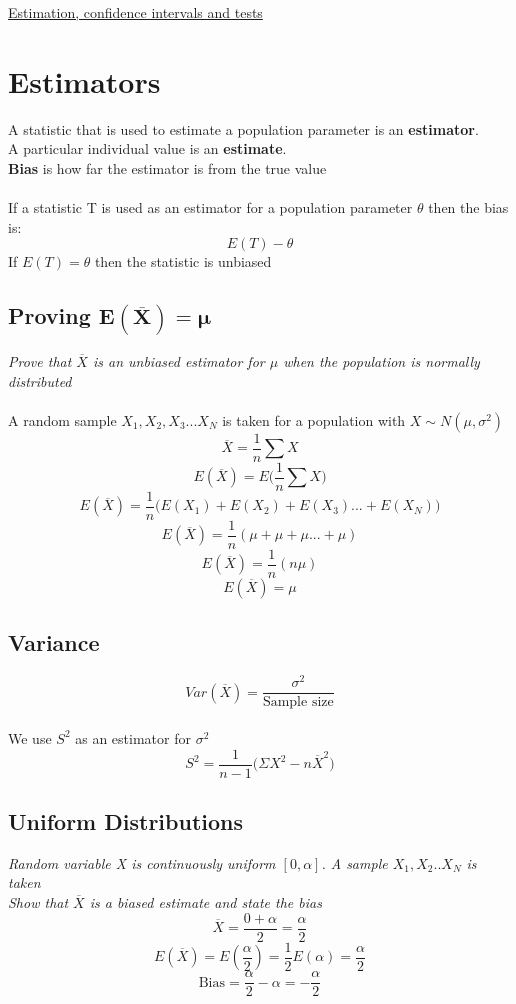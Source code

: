 \documentclass{article}[18pt]
\begin{document}
\begin{center}
\underline{\huge Estimation, confidence intervals and tests}
\end{center}
\section{Estimators}
A statistic that is used to estimate a population parameter is an \textbf{estimator}.\\
A particular individual value is an \textbf{estimate}.\\
\textbf{Bias} is how far the estimator is from the true value\\
\\
If a statistic T is used as an estimator for a population parameter $\theta$ then the bias is:
$$E(T)-\theta$$
If $E(T)=\theta$ then the statistic is unbiased
\subsection{Proving $\mathbf{E(\overline{X})=\mu}$}
\textit{Prove that $\overline{X}$ is an unbiased estimator for $\mu$ when the population is normally distributed}\\
\\
A random sample $X_1,X_2,X_3...X_N$ is taken for a population with $X\sim N(\mu,\sigma^2)$
$$\overline{X}=\frac{1}{n}\sum X$$
$$E(\overline{X})=E\Big(\frac{1}{n}\sum X\Big)$$
$$E(\overline{X})=\frac{1}{n}\big(E(X_1)+E(X_2)+E(X_3)...+E(X_N)\big)$$
$$E(\overline{X})=\frac{1}{n}(\mu+\mu+\mu...+\mu)$$
$$E(\overline{X})=\frac{1}{n}(n\mu)$$
$$E(\overline{X})=\mu$$
\subsection{Variance}
$$Var(\overline{X})=\frac{\sigma^2}{\textrm{Sample size}}$$
\\
We use $S^2$ as an estimator for $\sigma^2$
$$S^2=\frac{1}{n-1}\Big(\Sigma X^2-n\overline{X}^2\Big)$$
\subsection{Uniform Distributions}
\textit{Random variable X is continuously uniform $[0,\alpha]$. A sample $X_1,X_2..X_N$ is taken}\\
\textit{Show that $\overline{X}$ is a biased estimate and state the bias}
$$\overline{X}=\frac{0+\alpha}{2}=\frac{\alpha}{2}$$
$$E(\overline{X})=E(\frac{\alpha}{2})=\frac{1}{2}E(\alpha)=\frac{\alpha}{2}$$
$$\textrm{Bias}=\frac{\alpha}{2}-\alpha=-\frac{\alpha}{2}$$
\newpage
\end{document}
